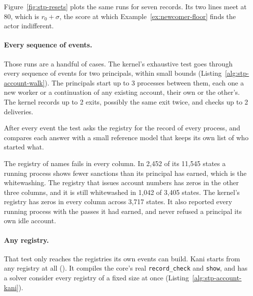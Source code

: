 Figure~\ref{fig:stp-resets} plots the same runs for seven records. Its
two lines meet at 80, which is $r_0+\sigma$, the score at which
Example~\ref{ex:newcomer-floor} finds the actor indifferent.

\paragraph{Every sequence of events.}
Those runs are a handful of cases. The kernel's exhaustive test goes
through every sequence of events for two principals, within small bounds
(Listing~\ref{alg:stp-account-walk}). The principals start up to 3
processes between them, each one a new worker or a continuation of any
existing account, their own or the other's. The kernel records up to 2
exits, possibly the same exit twice, and checks up to 2 deliveries.


After every event the test asks the registry for the record of every
process, and compares each answer with a small reference model that
keeps its own list of who started what.

The registry of names fails in every column. In 2,452 of its 11,545
states a running process shows fewer sanctions than its principal has
earned, which is the whitewashing. The registry that issues account
numbers has zeros in the other three columns, and it is still whitewashed
in 1,042 of 3,405 states. The kernel's registry has zeros in every column
across 3,717 states. It also reported every running process with the
passes it had earned, and never refused a principal its own idle account.

\paragraph{Any registry.}
That test only reaches the registries its own events can build. Kani
starts from any registry at all (). It
compiles the core's real \texttt{record\_check} and \texttt{show}, and
has a solver consider every registry of a fixed size at once
(Listing~\ref{alg:stp-account-kani}).


